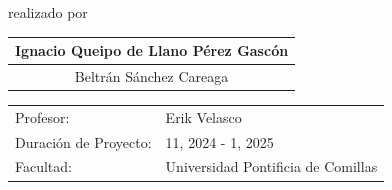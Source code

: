 \begin{titlepage}

\begin{center}

{\makeatletter
\largetitlestyle\fontsize{45}{45}\selectfont\@title
\makeatother}

{\makeatletter
\ifdefvoid{\@subtitle}{}{\bigskip\titlestyle\fontsize{20}{20}\selectfont\@subtitle}
\makeatother}

\bigskip
\bigskip

\bigskip
\bigskip

{\makeatletter
\largetitlestyle\fontsize{25}{25}\selectfont\@author
\makeatother}


\bigskip
\bigskip
\bigskip

realizado por

\bigskip
\bigskip
\bigskip
\setlength\extrarowheight{2pt}
\begin{tabular}{c}
    Ignacio Queipo  de Llano Pérez Gascón \\\midrule
    Beltrán Sánchez Careaga
    
\end{tabular}

\bigskip
\bigskip
\bigskip
\bigskip
\bigskip

\begin{tabular}{ll}
    Profesor: & Erik Velasco \\
    Duración de Proyecto: & 11, 2024 - 1, 2025 \\
    Facultad: & Universidad Pontificia de Comillas
\end{tabular}


\end{center}


\end{titlepage}
